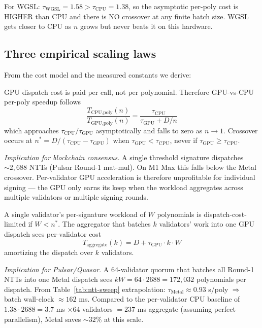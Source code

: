 For WGSL: $\tau_\text{WGSL} = 1.58 > \tau_\text{CPU} = 1.38$, so
the asymptotic per-poly cost is HIGHER than CPU and there is NO
crossover at any finite batch size. WGSL gets closer to CPU as
$n$ grows but never beats it on this hardware.

\subsection{Three empirical scaling laws}

From the cost model and the measured constants we derive:

\begin{theorem}
\label{thm:l1}
GPU dispatch cost is paid per call, not per polynomial. Therefore
GPU-vs-CPU per-poly speedup follows
\[
\frac{T_\text{CPU,poly}(n)}{T_\text{GPU,poly}(n)}
= \frac{\tau_\text{CPU}}{\tau_\text{GPU} + D/n}
\]
which approaches
$\tau_\text{CPU} / \tau_\text{GPU}$ asymptotically and falls
to zero as $n \to 1$. Crossover occurs at
$n^* = D / (\tau_\text{CPU} - \tau_\text{GPU})$ when
$\tau_\text{GPU} < \tau_\text{CPU}$, never if
$\tau_\text{GPU} \geq \tau_\text{CPU}$.
\end{theorem}

\textit{Implication for blockchain consensus.} A single threshold
signature dispatches $\sim 2{,}688$ NTTs (Pulsar Round-1 mat-mul).
On M1 Max this falls below the Metal crossover. Per-validator GPU
acceleration is therefore unprofitable for individual signing — the
GPU only earns its keep when the workload aggregates across
multiple validators or multiple signing rounds.

\begin{theorem}
\label{thm:l2}
A single validator's per-signature workload of $W$ polynomials is
dispatch-cost-limited if $W < n^*$. The aggregator that batches $k$
validators' work into one GPU dispatch sees per-validator cost
\[
T_\text{aggregate}(k) = D + \tau_\text{GPU} \cdot k \cdot W
\]
amortizing the dispatch over $k$ validators.
\end{theorem}

\textit{Implication for Pulsar/Quasar.} A 64-validator quorum that
batches all Round-1 NTTs into one Metal dispatch sees
$kW = 64 \cdot 2688 = 172{,}032$ polynomials per dispatch. From
Table~\ref{tab:ntt-sweep} extrapolation: $\tau_\text{Metal} \approx
0.93$ \textmu s/poly $\Rightarrow$ batch wall-clock $\approx 162$ ms.
Compared to the per-validator CPU baseline of $1.38 \cdot 2688 =
3.7$ ms $\times 64$ validators $= 237$ ms aggregate (assuming
perfect parallelism), Metal saves $\sim 32\%$ at this scale.

